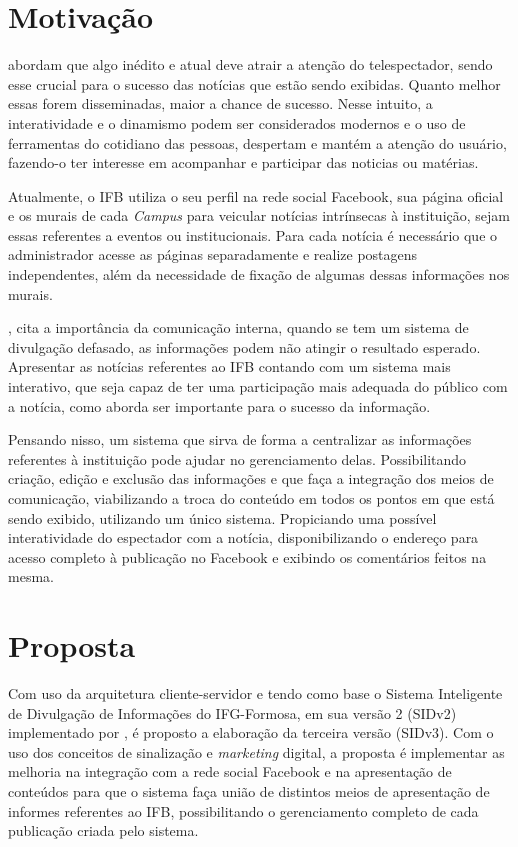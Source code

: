 \section{Motivação}
\citet{bianchi2006} abordam que algo inédito e atual deve atrair a atenção do telespectador, sendo esse crucial para o sucesso das notícias que estão sendo exibidas. Quanto melhor essas forem disseminadas, maior a chance de sucesso. Nesse intuito, a interatividade e o dinamismo podem ser considerados modernos e o uso de ferramentas do cotidiano das pessoas, despertam e mantém a atenção do usuário, fazendo-o ter interesse em acompanhar e participar das noticias ou matérias.

Atualmente, o IFB utiliza o seu perfil na rede social Facebook, sua página oficial e os murais de cada \textit{Campus} para veicular notícias intrínsecas à instituição, sejam essas referentes a eventos ou institucionais. Para cada notícia é necessário que o administrador acesse as páginas separadamente e realize postagens independentes, além da necessidade de fixação de algumas dessas informações nos murais.

\citet{pinheiro2010}, cita a importância da comunicação interna, quando se tem um sistema de divulgação defasado, as informações podem não atingir o resultado esperado. Apresentar as notícias referentes ao IFB contando com um sistema mais interativo, que seja capaz de ter uma participação mais adequada do público com a notícia, como \citet{santos2014} aborda ser importante para o sucesso da informação.

Pensando nisso, um sistema que sirva de forma a centralizar as informações referentes à instituição pode ajudar no gerenciamento delas. Possibilitando criação, edição e exclusão das informações e que faça a integração dos meios de comunicação, viabilizando a troca do conteúdo em todos os pontos em que está sendo exibido, utilizando um único sistema. Propiciando uma possível interatividade do espectador com a notícia, disponibilizando o endereço para acesso completo à publicação no Facebook e exibindo os comentários feitos na mesma.

\section{Proposta}
Com uso da arquitetura cliente-servidor e tendo como base o Sistema Inteligente de Divulgação de Informações do IFG-Formosa, em sua versão 2 (SIDv2) implementado por \citet{sobrinho2017}, é proposto a elaboração da terceira versão (SIDv3). Com o uso dos conceitos de sinalização e \textit{marketing} digital, a proposta é implementar as melhoria na integração com a rede social Facebook e na apresentação de conteúdos para que o sistema faça união de distintos meios de apresentação de informes referentes ao IFB, possibilitando o gerenciamento completo de cada publicação criada pelo sistema.

